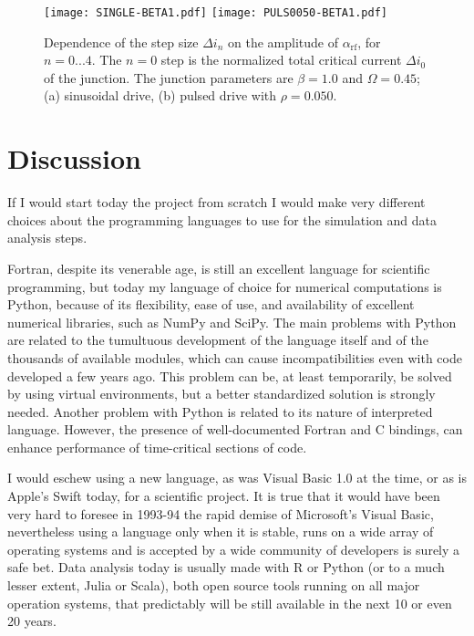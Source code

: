\begin{figure}[tbh]
	\centering
	\texttt{[image: SINGLE-BETA1.pdf]}
	\texttt{[image: PULS0050-BETA1.pdf]}
	\caption{Dependence of the step size $\Delta i_n$ on the amplitude of  $\alpha_\mathrm{rf}$, for $n = 0. . . 4$. The $n = 0$ step is the normalized total critical current $\Delta i_0$ of the junction. The junction parameters are $\beta = 1.0$ and $\Omega = 0. 45$; (a) sinusoidal drive, (b) pulsed drive with $\rho = 0. 050$.}
	\label{fig:step-width-beta1}
\end{figure}



\section{Discussion}

If I would start today the project from scratch I would make very different choices about the programming languages to use for the simulation and data analysis steps.

Fortran, despite its venerable age, is still an excellent language for scientific programming, but today my language of choice for numerical computations is Python, because of its flexibility, ease of use, and  availability of excellent numerical libraries, such as NumPy and SciPy.
The main problems with Python are related to the tumultuous development of the language itself and of the thousands of available modules, which can cause incompatibilities even with code developed a few years ago. This problem can be, at least temporarily, be solved by using virtual environments, but a better standardized solution is strongly needed.
Another problem with Python is related to its nature of interpreted language. However, the presence of well-documented Fortran and C bindings, can enhance performance of time-critical sections of code.

I would eschew using a new language, as was Visual Basic 1.0 at the time, or as is Apple's Swift today, for a scientific project. 
It is true that it would have been very hard to foresee in 1993-94 the rapid demise of Microsoft's Visual Basic, nevertheless using a language only when it is stable, runs on a wide array of operating systems and is accepted by a wide community of developers is surely a safe bet.
Data analysis today is usually made with R or Python (or to a much lesser extent, Julia or Scala), both open source tools running on all major operation systems, that predictably will be still available in the next 10 or even 20 years.


